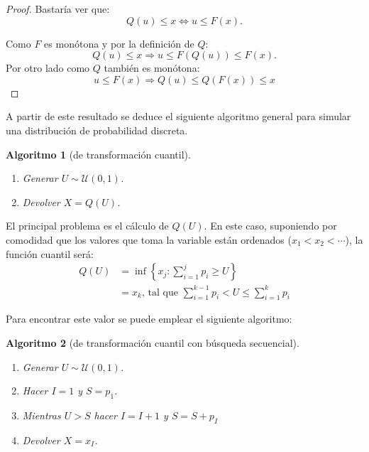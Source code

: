 \documentclass[
]{book}
\theoremstyle{break}
\newtheorem{conjecture}{Algoritmo}[chapter]
\theoremstyle{nonumberplain}
\newtheorem{proof}{Demostración}
\begin{document}
\begin{proof}
Bastaría ver que:
\[Q\left( u\right) \leq x \Longleftrightarrow u\leq F(x).\]

Como \(F\) es monótona y por la definición de \(Q\):
\[Q\left( u\right) \leq x \Rightarrow u \leq F(Q\left( u\right)) \leq F(x).\]
Por otro lado como \(Q\) también es monótona:
\[u \leq F(x) \Rightarrow Q\left( u\right) \leq Q(F(x)) \leq x\]
\end{proof}

A partir de este resultado se deduce el siguiente algoritmo general para simular una distribución de probabilidad discreta.

\begin{conjecture}[de transformación cuantil]

\begin{enumerate}
\def\labelenumi{\arabic{enumi}.}
\item
  Generar \(U\sim \mathcal{U}\left( 0,1\right)\).
\item
  Devolver \(X=Q\left( U\right)\).
\end{enumerate}

\end{conjecture}

El principal problema es el cálculo de \(Q\left( U\right)\).
En este caso, suponiendo por comodidad que los valores que toma la variable están ordenados (\(x_{1}<x_{2}<\cdots\)), la función cuantil será:
\[\begin{array}{ll}
Q\left( U\right) &=\inf \left\{ x_{j}:\sum_{i=1}^{j}p_{i}\geq U\right\} \\
&=x_{k}\text{, tal que }\sum_{i=1}^{k-1}p_{i}<U\leq \sum_{i=1}^{k}p_{i}
\end{array}\]

Para encontrar este valor se puede emplear el siguiente algoritmo:

\begin{conjecture}[de transformación cuantil con búsqueda secuencial]

\begin{enumerate}
\def\labelenumi{\arabic{enumi}.}
\item
  Generar \(U\sim \mathcal{U}\left( 0,1\right)\).
\item
  Hacer \(I=1\) y \(S=p_{1}\).
\item
  Mientras \(U>S\) hacer \(I=I+1\) y \(S=S+p_{I}\)
\item
  Devolver \(X=x_{I}\).
\end{enumerate}

\end{conjecture}
\end{document}
